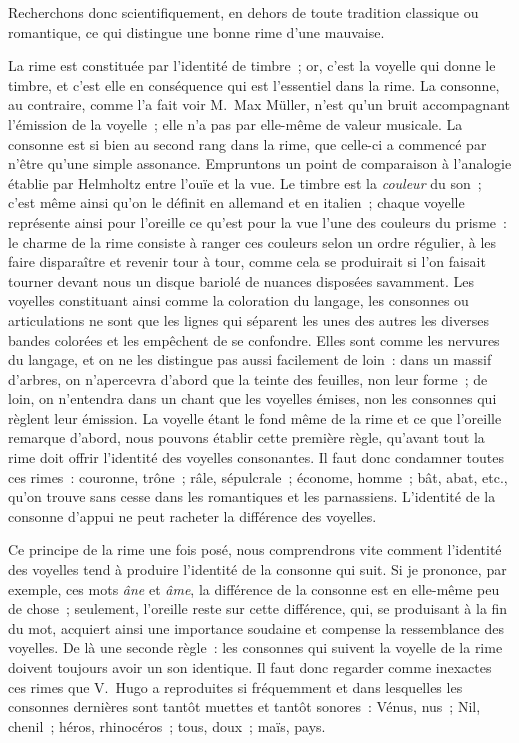\documentclass[french,twoside]{book} %
\begin{document}
Recherchons donc scientifiquement, en dehors de toute tradition classique ou romantique, ce qui distingue une bonne rime d’une mauvaise.\par
La rime est constituée par l’identité de timbre ; or, c’est la voyelle qui donne le timbre, et c’est elle en conséquence qui est l’essentiel dans la rime. La consonne, au contraire, comme l’a fait voir M. Max Müller, n’est qu’un bruit accompagnant l’émission de la voyelle ; elle n’a pas par elle-même de valeur musicale. La consonne est si bien au second rang dans la rime, que celle-ci a commencé par n’être qu’une simple assonance. Empruntons un point de comparaison à l’analogie établie par Helmholtz entre l’ouïe et la vue. Le timbre est la \emph{couleur} du son ; c’est même ainsi qu’on le définit en allemand et en italien ; chaque voyelle représente ainsi pour l’oreille ce qu’est pour la vue l’une des couleurs du prisme : le charme de la rime consiste à ranger ces couleurs selon un ordre régulier, à les faire disparaître et revenir tour à tour, comme cela se produirait si l’on faisait tourner devant nous un disque bariolé de nuances disposées savamment. Les voyelles constituant  ainsi comme la coloration du langage, les consonnes ou articulations ne sont que les lignes qui séparent les unes des autres les diverses bandes colorées et les empêchent de se confondre. Elles sont comme les nervures du langage, et on ne les distingue pas aussi facilement de loin : dans un massif d’arbres, on n’apercevra d’abord que la teinte des feuilles, non leur forme ; de loin, on n’entendra dans un chant que les voyelles émises, non les consonnes qui règlent leur émission. La voyelle étant le fond même de la rime et ce que l’oreille remarque d’abord, nous pouvons établir cette première règle, qu’avant tout la rime doit offrir l’identité des voyelles consonantes. Il faut donc condamner toutes ces rimes : couronne, trône ; râle, sépulcrale ; économe, homme ; bât, abat, etc., qu’on trouve sans cesse dans les romantiques et les parnassiens. L’identité de la consonne d’appui ne peut racheter la différence des voyelles.\par
Ce principe de la rime une fois posé, nous comprendrons vite comment l’identité des voyelles tend à produire l’identité de la consonne qui suit. Si je prononce, par exemple, ces mots \emph{âne} et \emph{âme}, la différence de la consonne est en elle-même peu de chose ; seulement, l’oreille reste sur cette différence, qui, se produisant à la fin du mot, acquiert ainsi une importance soudaine et compense la ressemblance des voyelles. De là une seconde règle : les consonnes qui suivent la voyelle de la rime doivent toujours avoir un son identique. Il faut donc regarder comme inexactes ces rimes que V. Hugo a reproduites si fréquemment et dans lesquelles les consonnes dernières sont tantôt muettes  et tantôt sonores : Vénus, nus ; Nil, chenil ; héros, rhinocéros ; tous, doux ; maïs, pays.\par
\end{document}
